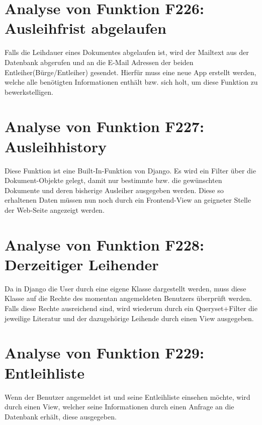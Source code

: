 \section{Analyse von Funktion F226: Ausleihfrist abgelaufen}
Falls die Leihdauer eines Dokumentes abgelaufen ist, wird der Mailtext aus der 
Datenbank abgerufen und an die E-Mail Adressen der beiden Entleiher(Bürge/Entleiher)
gesendet. Hierfür muss eine neue App erstellt werden, welche alle benötigten Informationen enthält bzw. sich holt, um diese Funktion zu bewerkstelligen.

\section{Analyse von Funktion F227: Ausleihhistory}
Diese Funktion ist eine Built-In-Funktion von Django.
Es wird ein Filter über die Dokument-Objekte gelegt, damit nur bestimmte bzw. die gewünschten Dokumente und deren bisherige Ausleiher ausgegeben werden. Diese so erhaltenen Daten müssen nun noch durch ein Frontend-View an geigneter Stelle der Web-Seite angezeigt werden.

\section{Analyse von Funktion F228: Derzeitiger Leihender}
Da in Django die User durch eine eigene Klasse dargestellt werden, muss diese Klasse auf die Rechte des momentan angemeldeten Benutzers überprüft werden. Falls diese Rechte ausreichend sind, wird wiederum durch ein Queryset+Filter die jeweilige Literatur und der dazugehörige Leihende durch einen View ausgegeben.


\section{Analyse von Funktion F229: Entleihliste}
Wenn der Benutzer angemeldet ist und seine Entleihliste einsehen möchte, wird 
durch einen View, welcher seine Informationen durch einen Anfrage an die Datenbank 
erhält, diese ausgegeben.

